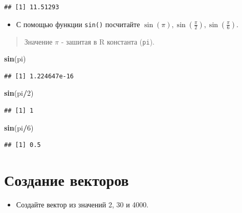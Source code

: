 \documentclass[]{book}
\newenvironment{Shaded}{\begin{snugshade}}{\end{snugshade}}
\newcommand{\KeywordTok}[1]{\textcolor[rgb]{0.13,0.29,0.53}{\textbf{#1}}}
\newcommand{\DecValTok}[1]{\textcolor[rgb]{0.00,0.00,0.81}{#1}}
\newcommand{\OperatorTok}[1]{\textcolor[rgb]{0.81,0.36,0.00}{\textbf{#1}}}
\newcommand{\NormalTok}[1]{#1}
\providecommand{\tightlist}{%
  \setlength{\itemsep}{0pt}\setlength{\parskip}{0pt}}
\begin{document}
\begin{verbatim}
## [1] 11.51293
\end{verbatim}

\begin{itemize}
\tightlist
\item
  С помощью функции \texttt{sin()} посчитайте
  \(\sin (\pi), \sin \left(\frac{\pi}{2}\right), \sin \left(\frac{\pi}{6}\right)\).
\end{itemize}

\begin{quote}
Значение \(\pi\) - зашитая в R константа (\texttt{pi}).
\end{quote}

\begin{Shaded}
\begin{Highlighting}[]
\KeywordTok{sin}\NormalTok{(pi)}
\end{Highlighting}
\end{Shaded}

\begin{verbatim}
## [1] 1.224647e-16
\end{verbatim}

\begin{Shaded}
\begin{Highlighting}[]
\KeywordTok{sin}\NormalTok{(pi}\OperatorTok{/}\DecValTok{2}\NormalTok{)}
\end{Highlighting}
\end{Shaded}

\begin{verbatim}
## [1] 1
\end{verbatim}

\begin{Shaded}
\begin{Highlighting}[]
\KeywordTok{sin}\NormalTok{(pi}\OperatorTok{/}\DecValTok{6}\NormalTok{)}
\end{Highlighting}
\end{Shaded}

\begin{verbatim}
## [1] 0.5
\end{verbatim}

\section{Создание векторов}\label{solution_new_vecs}

\begin{itemize}
\tightlist
\item
  Создайте вектор из значений 2, 30 и 4000.
\end{itemize}
\end{document}
